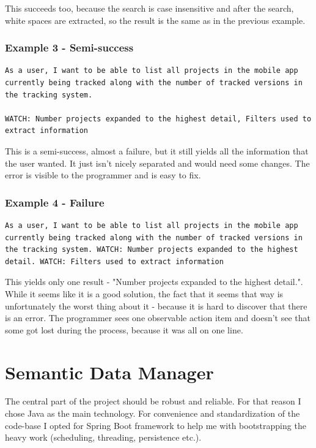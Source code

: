 This succeeds too, because the search is case insensitive and after the search, white spaces are extracted, so the result is the same as in the previous example.

\subsubsection*{Example 3 - Semi-success}

\begin{lstlisting}
As a user, I want to be able to list all projects in the mobile app currently being tracked along with the number of tracked versions in the tracking system.

WATCH: Number projects expanded to the highest detail, Filters used to extract information
\end{lstlisting}

This is a semi-success, almost a failure, but it still yields all the information that the user wanted. It just isn't nicely separated and would need some changes. The error is visible to the programmer and is easy to fix.

\subsubsection*{Example 4 - Failure}

\begin{lstlisting}
As a user, I want to be able to list all projects in the mobile app currently being tracked along with the number of tracked versions in the tracking system. WATCH: Number projects expanded to the highest detail. WATCH: Filters used to extract information
\end{lstlisting}

This yields only one result - "Number projects expanded to the highest detail.". While it seems like it is a good solution, the fact that it seems that way is unfortunately the worst thing about it - because it is hard to discover that there is an error. The programmer sees one observable action item and doesn't see that some got lost during the process, because it was all on one line.

\section{Semantic Data Manager}

The central part of the project should be robust and reliable. For that reason I chose Java as the main technology. For convenience and standardization of the code-base I opted for Spring Boot framework to help me with bootstrapping the heavy work (scheduling, threading, persistence etc.).

